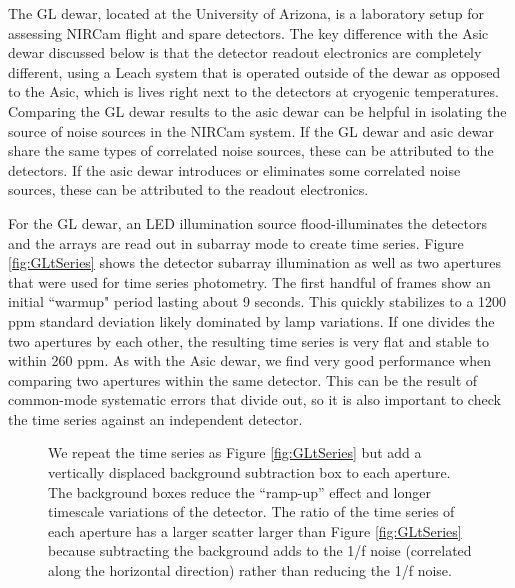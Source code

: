 \documentclass{aastex62}
\begin{document}
The GL dewar, located at the University of Arizona, is a laboratory setup for assessing NIRCam flight and spare detectors.
The key difference with the Asic dewar discussed below is that the detector readout electronics are completely different, using a Leach system that is operated outside of the dewar as opposed to the Asic, which is lives right next to the detectors at cryogenic temperatures.
Comparing the GL dewar results to the asic dewar can be helpful in isolating the source of noise sources in the NIRCam system.
If the GL dewar and asic dewar share the same types of correlated noise sources, these can be attributed to the detectors.
If the asic dewar introduces or eliminates some correlated noise sources, these can be attributed to the readout electronics.

For the GL dewar, an LED illumination source flood-illuminates the detectors and the arrays are read out in subarray mode to create time series.
Figure \ref{fig:GLtSeries} shows the detector subarray illumination as well as two apertures that were used for time series photometry.
The first handful of frames show an initial ``warmup" period lasting about 9 seconds.
This quickly stabilizes to a 1200 ppm standard deviation likely dominated by lamp variations.
If one divides the two apertures by each other, the resulting time series is very flat and stable to within 260 ppm.
As with the Asic dewar, we find very good performance when comparing two apertures within the same detector.
This can be the result of common-mode systematic errors that divide out, so it is also important to check the time series against an independent detector.

\begin{figure}
\caption{We repeat the time series as Figure \ref{fig:GLtSeries} but add a vertically displaced background subtraction box to each aperture.
The background boxes reduce the ``ramp-up'' effect and longer timescale variations of the detector.
The ratio of the time series of each aperture has a larger scatter larger than Figure \ref{fig:GLtSeries} because subtracting the background adds to the 1/f noise (correlated along the horizontal direction) rather than reducing the 1/f noise.
}\label{fig:GLtSeriesBacksub}
\end{figure}
\end{document}
